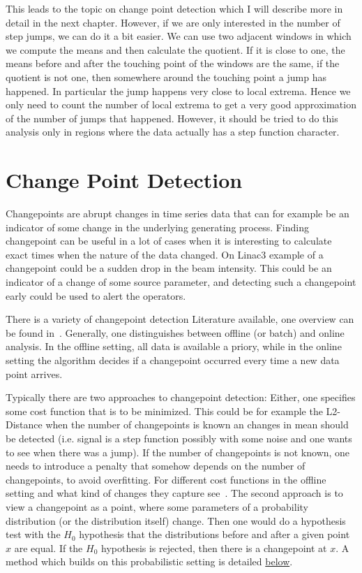 \documentclass[12pt,a4paper]{article}
\begin{document}
This leads to the topic on change point detection which I will describe more in detail in the next chapter. However, if we are only interested in the number of step jumps, we can do it a bit easier. We can use two adjacent windows in which we compute the means and then calculate the quotient. If it is close to one, the means before and after the touching point of the windows are the same, if the quotient is not one, then somewhere around the touching point a jump has happened. In particular the jump happens very close to local extrema. Hence we only need to count the number of local extrema to get a very good approximation of the number of jumps that happened. However, it should be tried to do this analysis only in regions where the data actually has a step function character.

\hypertarget{change-point-detection}{%
\section{Change Point Detection}\label{change-point-detection}}

Changepoints are abrupt changes in time series data that can for example be an indicator of some change in the underlying generating process. Finding changepoint can be useful in a lot of cases when it is interesting to calculate exact times when the nature of the data changed. On Linac3 example of a changepoint could be a sudden drop in the beam intensity. This could be an indicator of a change of some source parameter, and detecting such a changepoint early could be used to alert the operators.

There is a variety of changepoint detection Literature available, one overview can be found in~\cite{Aminikhanghahi:surveymethodstime}. Generally, one distinguishes between offline (or batch) and online analysis. In the offline setting, all data is available a priory, while in the online setting the algorithm decides if a changepoint occurred every time a new data point arrives. 

Typically there are two approaches to changepoint detection: Either, one specifies some cost function that is to be minimized. This could be for example the L2-Distance when the number of changepoints is known an changes in mean should be detected (i.e. signal is a step function possibly with some noise and one wants to see when there was a jump). If the number of changepoints is not known, one needs to introduce a penalty that somehow depends on the number of changepoints, to avoid overfitting. For different cost functions in the offline setting and what kind of changes they capture see~\cite{Truong:Selectivereviewoffline}. The second approach is to view a changepoint as a point, where some parameters of a probability distribution (or the distribution itself) change. Then one would do a hypothesis test with the $H_0$ hypothesis that the distributions before and after a given point $x$ are equal. If the $H_0$ hypothesis is rejected, then there is a changepoint at $x$. A method which builds on this probabilistic setting is detailed \protect\hyperlink{bayesian-online-changepoint-detection}{below}.
\end{document}
